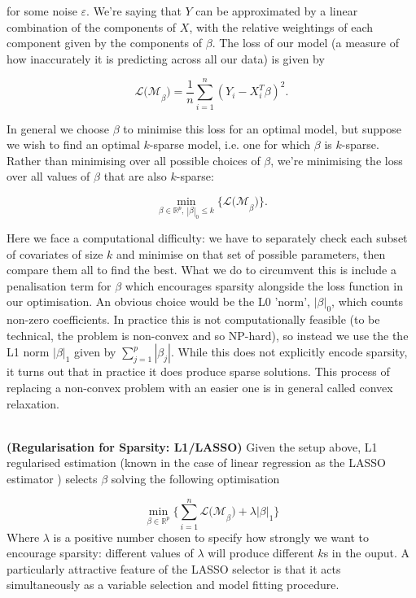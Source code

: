 \documentclass[thesis.tex]{subfiles}
\begin{document}
for some noise $\varepsilon$. We're saying that $Y$ can be approximated by a linear combination of the components of $X$, with the relative weightings of each component given by the components of $\beta$. The loss of our model (a measure of how inaccurately it is predicting across all our data) is given by 

\begin{equation}
\mathcal{L(M}_\beta) = \frac{1}{n}\sum\limits_{i=1}^{n} (Y_i - X_i^T\beta)^2. 
\end{equation}

In general we choose $\beta$ to minimise this loss for an optimal model, but suppose we wish to find an optimal $k$-sparse model, i.e. one for which $\beta$ is $k$-sparse. Rather than minimising over all possible choices of $\beta$, we're minimising the loss over all values of $\beta$ that are also $k$-sparse:

\begin{equation}
\min_{\beta \in \mathbb{R}^p, \ |\beta|_0 \leq k} \{ \mathcal{L(M}_\beta) \}.
\end{equation}

Here we face a computational difficulty: we have to separately check each subset of covariates of size $k$ and minimise on that set of possible parameters, then compare them all to find the best. What we do to circumvent this is include a penalisation term for $\beta$ which encourages sparsity alongside the loss function in our optimisation. An obvious choice would be the L0 'norm', $|\beta|_0$, which counts non-zero coefficients. In practice this is not computationally feasible (to be technical, the problem is non-convex and so NP-hard), so instead we use the the L1 norm $|\beta|_1$  given by $\sum_{j = 1}^{p} |\beta_j|$. While this does not explicitly encode sparsity, it turns out that in practice it does produce sparse solutions. This process of replacing a non-convex problem with an easier one is in general called convex relaxation. \\ ~ \\

\begin{technique}{\textbf{(Regularisation for Sparsity: L1/LASSO)}} \label{sec:lasso}
Given the setup above, L1 regularised estimation (known in the case of linear regression as the LASSO estimator \citep{tibshirani_regression_1996}) selects $\beta$ solving the following optimisation

$$\min_{\beta \in \mathbb{R}^p} \{\sum\limits_{i = 1}^{n} \mathcal{L(M}_\beta) + \lambda |\beta|_1 \} $$
Where $\lambda$ is a positive number chosen to specify how strongly we want to encourage sparsity: different values of $\lambda$ will produce different $k$s in the ouput. A particularly attractive feature of the LASSO selector is that it acts simultaneously as a variable selection and model fitting procedure.
\end{technique}
\end{document}
